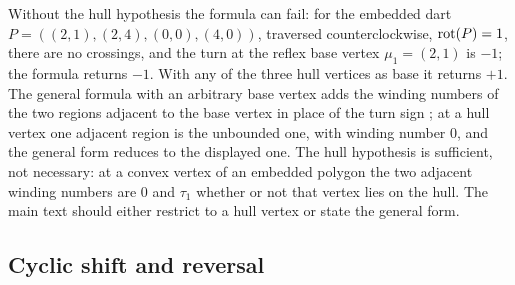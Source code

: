 \begin{remark}\label{rem:whitney-base}
Without the hull hypothesis the formula can fail: for the embedded dart
$P=((2,1),(2,4),(0,0),(4,0))$, traversed counterclockwise, $\operatorname{rot}(P)=1$, there
are no crossings, and the turn at the reflex base vertex $\mu_1=(2,1)$ is
$-1$; the formula returns $-1$. With any of the three hull vertices as base it
returns $+1$. The
general formula with an arbitrary base vertex adds the winding numbers of the
two regions adjacent to the base vertex in place of the turn sign
\cite{Polyak}; at a hull vertex one adjacent region is the unbounded one,
with winding number $0$, and the general form reduces to the displayed one.
The hull hypothesis is sufficient, not necessary: at a convex vertex of an
embedded polygon the two adjacent winding numbers are $0$ and $\tau_1$
whether or not that vertex lies on the hull. The main text should either
restrict to a hull vertex or state the general form.
\end{remark}

\subsection{Cyclic shift and reversal}

